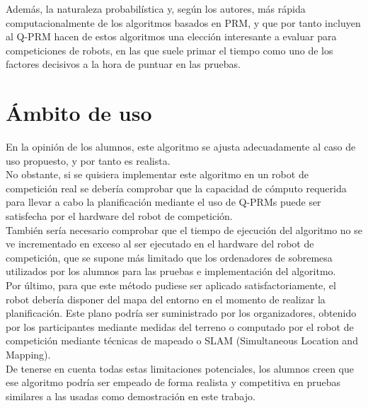 Además, la naturaleza probabilística y, según los autores, más rápida computacionalmente de los algoritmos basados en PRM, y que por tanto incluyen al Q-PRM hacen de estos algoritmos una elección interesante a evaluar para competiciones de robots, en las que suele primar el tiempo como uno de los factores decisivos a la hora de puntuar en las pruebas.\\


\section{Ámbito de uso}
\label{ambito}

En la opinión de los alumnos, este algoritmo se ajusta adecuadamente al caso de uso propuesto, y por tanto es realista.\\

No obstante, si se quisiera implementar este algoritmo en un robot de competición real se debería comprobar que la capacidad de cómputo requerida para llevar a cabo la planificación mediante el uso de Q-PRMs puede ser satisfecha por el hardware del robot de competición.\\

También sería necesario comprobar que el tiempo de ejecución del algoritmo no se ve incrementado en exceso al ser ejecutado en el hardware del robot de competición, que se supone más limitado que los ordenadores de sobremesa utilizados por los alumnos para las pruebas e implementación del algoritmo.\\

Por último, para que este método pudiese ser aplicado satisfactoriamente, el robot debería disponer del mapa del entorno en el momento de realizar la planificación. Este plano podría ser suministrado por los organizadores, obtenido por los participantes mediante medidas del terreno o computado por el robot de competición mediante técnicas de mapeado o SLAM (Simultaneous Location and Mapping).\\

De tenerse en cuenta todas estas limitaciones potenciales, los alumnos creen que ese algoritmo podría ser empeado de forma realista y competitiva en pruebas similares a las usadas como demostración en este trabajo.